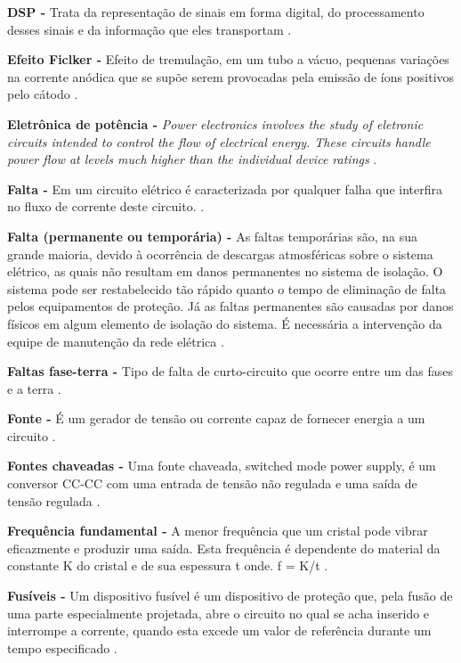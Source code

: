 \noindent
\textbf{DSP -} Trata da representação de sinais em forma digital, do processamento desses sinais e da informação que eles transportam \cite{HAD99}.

\noindent
\textbf{Efeito Ficlker -} Efeito de tremulação, em um tubo a vácuo, pequenas variações na corrente anódica que se supõe serem provocadas pela emissão de íons positivos pelo cátodo \cite{GAR82}.

\noindent
\textbf{Eletrônica de potência -} \textit{Power electronics involves the study of eletronic circuits intended to control the flow of electrical energy. These circuits handle power flow at levels much higher than the individual device ratings }\cite{RAS11}. 

\noindent
\textbf{Falta -} Em um circuito elétrico é caracterizada por qualquer falha que interfira no fluxo de corrente deste circuito. \cite{GRA96}.

\noindent
\textbf{Falta (permanente ou temporária) -} As faltas temporárias são, na sua grande maioria, devido à ocorrência de descargas atmosféricas sobre o sistema elétrico, as quais não resultam em danos permanentes no sistema de isolação. O sistema pode ser restabelecido tão rápido quanto o tempo de eliminação de falta pelos equipamentos de proteção. Já as faltas permanentes são causadas por danos físicos em algum elemento de isolação do sistema. É necessária a intervenção da equipe de manutenção da rede elétrica \cite{CAR97}.

\noindent
\textbf{Faltas fase-terra -} Tipo de falta de curto-circuito que ocorre entre um das fases e a terra \cite{CAR97}.

\noindent
\textbf{Fonte -} É um gerador de tensão ou corrente capaz de fornecer energia a um circuito \cite{DOR08}.

\noindent
\textbf{Fontes chaveadas -} Uma fonte chaveada, switched mode power supply, é um conversor CC-CC com uma entrada de tensão não regulada e uma saída de tensão regulada \cite{FIN02}.

\noindent
\textbf{Frequência fundamental -} A menor frequência que um cristal pode vibrar eficazmente e produzir uma saída. Esta frequência é dependente do material da constante K do cristal e de sua espessura t onde. f = K/t \cite{MAL07}.

\noindent
\textbf{Fusíveis -} Um dispositivo fusível é um dispositivo de proteção que, pela fusão de uma parte especialmente projetada, abre o circuito no qual se acha inserido e interrompe a corrente, quando esta excede um valor de referência durante um tempo especificado \cite{COR05}.

